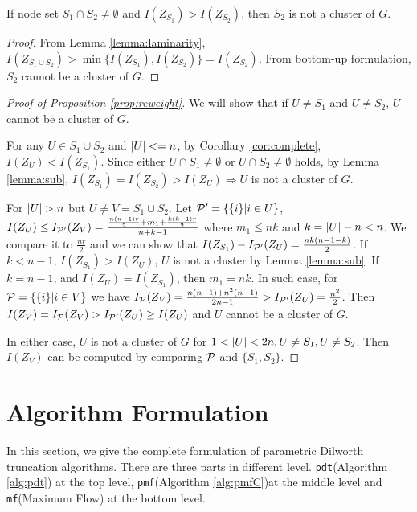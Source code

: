 \documentclass{article}
\begin{document}

\begin{lemma}\label{lemma:sub}
	If node set $S_1 \cap S_2 \neq \emptyset$ and $I(Z_{S_1}) > I(Z_{S_2})$, then $S_2$ is not a cluster of $G$.
\end{lemma}
\begin{proof}
	From Lemma \ref{lemma:laminarity},
	$I(Z_{S_1\cup S_2}) > \min\{I(Z_{S_1}), I(Z_{S_2})\} = I(Z_{S_2})$. From bottom-up formulation,  $S_2$ cannot be a cluster of $G$.
\end{proof}
\begin{proof}[Proof of Proposition \ref{prop:reweight}]
	We will show that if $U \neq S_1$ and $U \neq S_2$, $U$ cannot be a cluster of $G$.
	
For any $U \in S_1 \cup S_2 $ and $\abs{U} <= n$, by Corollary \ref{cor:complete}, $I(Z_U) < I(Z_{S_1})$.
Since either $U \cap S_1 \neq \emptyset$ or $U \cap S_2 \neq \emptyset$ holds, by Lemma \ref{lemma:sub}, $I(Z_{S_1})= I(Z_{S_2}) > I(Z_U) \Rightarrow U$ is not a cluster of $G$.

For $\abs{U} > n$ but $U \neq V = S_1 \cup S_2$. Let $\P' = \{\{i\}| i\in U\}$, $I(Z_U) \leq I_{\P'}(Z_V) = \frac{\frac{n(n-1)r}{2} + m_1 + \frac{k(k-1)r}{2}}{n+k-1}$ where $m_1 \leq nk$ and $k=\abs{U} - n < n$. 
We compare it to $\frac{nr}{2}$ and we can show that $I(Z_{S_1}) - I_{\P'}(Z_U) = \frac{nk(n-1-k)}{2}$. If $k<n-1$, $I(Z_{S_1})>I(Z_U)$, $U$ is not a cluster by Lemma \ref{lemma:sub}. If $k=n-1$, and $I(Z_U) = I(Z_{S_1})$, then $m_1=nk$. In such case, for $\P=\{\{i\}|i\in V\}$ we have $I_{\P}(Z_V) = \frac{n(n-1)+n^2(n-1)}{2n-1} > I_{\P'}(Z_U)=\frac{n^2}{2}$. Then $I(Z_V) = I_{\P}(Z_V) > I_{\P'}(Z_U) \geq I(Z_U)$ and $U$ cannot be a cluster of $G$.

 In either case, $U$ is not a cluster of $G$ for $1<\abs{U}<2n, U \neq S_1, U\neq S_2$. Then $I(Z_V)$ can be computed by comparing $\P$ and $\{S_1, S_2\}$.

\end{proof}

\section{Algorithm Formulation}
In this section, we give the complete formulation of parametric Dilworth truncation algorithms. There are three parts in different level. \texttt{pdt}(Algorithm \ref{alg:pdt}) at the top level, \texttt{pmf}(Algorithm \ref{alg:pmfC})at the middle level and \texttt{mf}(Maximum Flow) at the bottom level.
\end{document}
